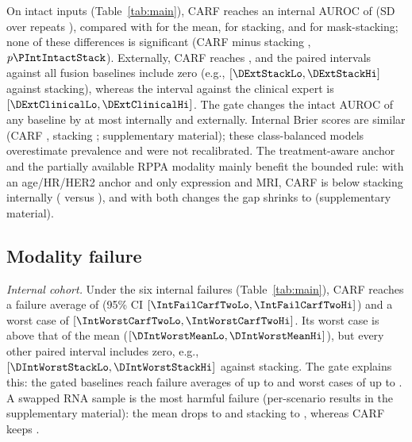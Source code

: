 \documentclass[a4paper,runningheads]{llncs}
\begin{document}
On intact inputs (Table~\ref{tab:main}), CARF reaches an internal AUROC of \IntCarfTwo{} (SD over repeats \IntCarfTwoSd{}), compared with \IntMean{} for the mean, \IntStack{} for stacking, and \IntMaskStack{} for mask-stacking; none of these differences is significant (CARF minus stacking \DIntIntactStack{}, $p\PIntIntactStack$). Externally, CARF reaches \ExtCarfTwo{}, and the paired intervals against all fusion baselines include zero (e.g., $[\DExtStackLo,\DExtStackHi]$ against stacking), whereas the interval against the clinical expert is $[\DExtClinicalLo,\DExtClinicalHi]$. The gate changes the intact AUROC of any baseline by at most \GateIntactDropInt{} internally and \GateIntactDropExt{} externally. Internal Brier scores are similar (CARF \IntBrierCarfTwo{}, stacking \IntBrierStack{}; supplementary material); these class-balanced models overestimate prevalence and were not recalibrated. The treatment-aware anchor and the partially available RPPA modality mainly benefit the bounded rule: with an age/HR/HER2 anchor and only expression and MRI, CARF is \DesGapVOne{} below stacking internally (\DesVOneCarfTwo{} versus \DesVOneStack{}), and with both changes the gap shrinks to \DesGapFinal{} (supplementary material).

\subsection{Modality failure}
\label{sec:stress}

\emph{Internal cohort.} Under the six internal failures (Table~\ref{tab:main}), CARF reaches a failure average of \IntFailCarfTwo{} (95\% CI $[\IntFailCarfTwoLo,\IntFailCarfTwoHi]$) and a worst case of \IntWorstCarfTwo{} $[\IntWorstCarfTwoLo,\IntWorstCarfTwoHi]$. Its worst case is above that of the mean ($[\DIntWorstMeanLo,\DIntWorstMeanHi]$), but every other paired interval includes zero, e.g., $[\DIntWorstStackLo,\DIntWorstStackHi]$ against stacking. The gate explains this: the gated baselines reach failure averages of up to \IntFailGatedMean{} and worst cases of up to \IntWorstGatedOffsetLr{}. A swapped RNA sample is the most harmful failure (per-scenario results in the supplementary material): the mean drops to \IntRnaSwapMean{} and stacking to \IntRnaSwapStack{}, whereas CARF keeps \IntRnaSwapCarfTwo{}.
\end{document}
